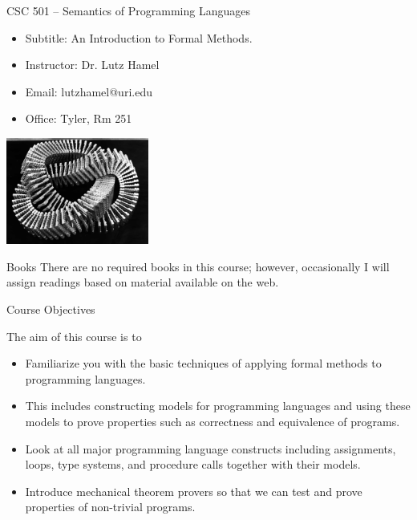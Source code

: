 \documentclass{beamer}
\begin{document}
\begin{frame}{CSC 501 -- Semantics of Programming Languages}
\begin{itemize}
\item Subtitle: An Introduction to Formal Methods.
\item	Instructor: Dr. Lutz Hamel
\item	Email: lutzhamel@uri.edu
\item	Office: Tyler, Rm 251
\end{itemize}

\vspace{.1in}

\begin{center}
    \includegraphics[height=35mm]{images/legoknot}
\end{center}

\end{frame}

\begin{frame}{Books}
There are no required books in this course; however, occasionally I will assign readings based on material
available on the web.
\end{frame}

\begin{frame}{Course Objectives}

The aim of this course is to
\begin{itemize}
\item Familiarize you with the basic techniques of applying formal methods to programming languages.

\item This includes constructing models for programming languages and using these models to prove properties such as correctness and equivalence of programs.

\item Look at all major programming language constructs including assignments, loops, type systems, and procedure calls together with their models.

\item Introduce mechanical theorem provers so that we can test and prove properties of non-trivial programs.
\end{itemize}
\end{frame}
\end{document}
